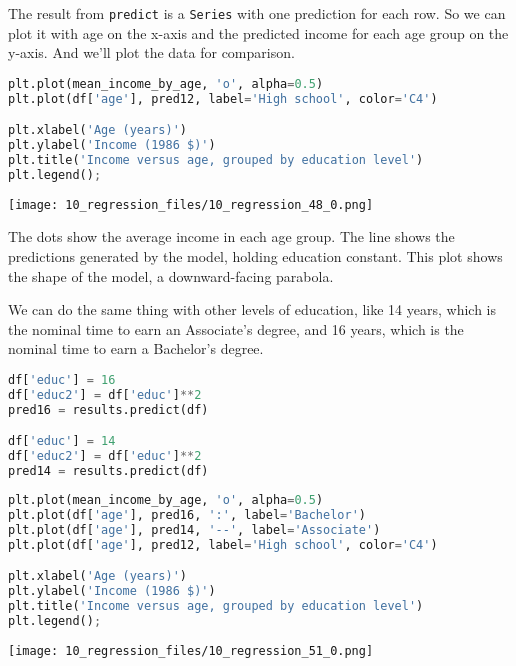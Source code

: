 The result from \passthrough{\lstinline!predict!} is a
\passthrough{\lstinline!Series!} with one prediction for each row. So we
can plot it with age on the x-axis and the predicted income for each age
group on the y-axis. And we'll plot the data for comparison.

\pagebreak

\begin{lstlisting}[language=Python,style=source]
plt.plot(mean_income_by_age, 'o', alpha=0.5)
plt.plot(df['age'], pred12, label='High school', color='C4')

plt.xlabel('Age (years)')
plt.ylabel('Income (1986 $)')
plt.title('Income versus age, grouped by education level')
plt.legend();
\end{lstlisting}

\begin{center}
\texttt{[image: 10\_regression\_files/10\_regression\_48\_0.png]}
\end{center}

The dots show the average income in each age group. The line shows the
predictions generated by the model, holding education constant. This
plot shows the shape of the model, a downward-facing parabola.

We can do the same thing with other levels of education, like 14 years,
which is the nominal time to earn an Associate's degree, and 16 years,
which is the nominal time to earn a Bachelor's degree.

\begin{lstlisting}[language=Python,style=source]
df['educ'] = 16
df['educ2'] = df['educ']**2
pred16 = results.predict(df)

df['educ'] = 14
df['educ2'] = df['educ']**2
pred14 = results.predict(df)
\end{lstlisting}

\pagebreak

\begin{lstlisting}[language=Python,style=source]
plt.plot(mean_income_by_age, 'o', alpha=0.5)
plt.plot(df['age'], pred16, ':', label='Bachelor')
plt.plot(df['age'], pred14, '--', label='Associate')
plt.plot(df['age'], pred12, label='High school', color='C4')

plt.xlabel('Age (years)')
plt.ylabel('Income (1986 $)')
plt.title('Income versus age, grouped by education level')
plt.legend();
\end{lstlisting}

\begin{center}
\texttt{[image: 10\_regression\_files/10\_regression\_51\_0.png]}
\end{center}

